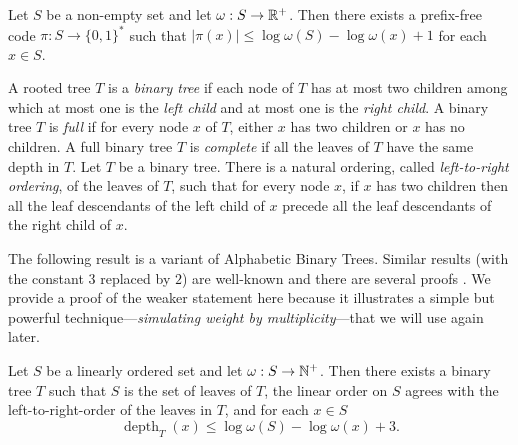 \documentclass{patmorin}
\renewcommand{\le}{\leqslant}
\newcommand{\pat}[1]{\textcolor{Magenta}{PaMo: #1}}
\newcommand{\piotr}[1]{\textcolor{red}{PiMi: #1}}
\DeclareMathOperator{\depth}{depth}
\newcommand{\defin}[1]{\emph{\textcolor{brightmaroon}{#1}}}
\begin{document}
  \begin{lem}
  \label{shannon_code}
    Let $S$ be a non-empty set and let $\omega:S\to\mathbb{R}^+$.  Then there exists a prefix-free code $\pi:S\to\{0,1\}^*$ such that $|\pi(x)|\le \log\omega(S)-\log\omega(x)+1$ for each $x\in S$.
  \end{lem}

  A rooted tree $T$ is a \defin{binary tree} if each node of $T$ has at most two children among which at most one is the \defin{left child} and at most one is the \defin{right child}. 
  A binary tree $T$ is \defin{full} if for every node $x$ of $T$,
  either $x$ has two children or $x$ has no children.
  A full binary tree $T$ is \defin{complete} if all the leaves of $T$ have the same depth in $T$.
  Let $T$ be a binary tree. There is a natural ordering, called \defin{left-to-right ordering}, of the leaves of $T$, such that for every node $x$, if $x$ has two children then all the leaf descendants of the left child of $x$ precede all the leaf descendants of the right child of $x$.


  The following result is a variant of Alphabetic Binary Trees. Similar results (with the constant $3$ replaced by $2$) are well-known and there are several proofs \cite{knuth:art_iii,mehlhorn:nearly,gilbert.moore:variable_length}. We provide a proof of the weaker statement here because it illustrates a simple but powerful technique---\defin{simulating weight by multiplicity}---that we will use again later.

   \begin{lem}\label{shannon_fano_elias_tree}\label{shannon_fano_elias}
    Let $S$ be a linearly ordered set and let $\omega:S\to\mathbb{N}^+$. Then there exists a binary tree $T$ such that $S$ is the set of leaves of $T$,
    the linear order on $S$ agrees with the left-to-right-order of the leaves in $T$, and for each $x\in S$
    \[
    \depth_{T}(x)\le \log\omega(S) - \log\omega(x) + 3.
    \]
  \end{lem}

\end{document}
